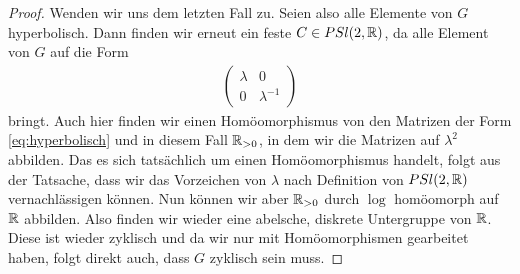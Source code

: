 \begin{proof}
  Wenden wir uns dem letzten Fall zu. Seien also alle Elemente von $G$
  hyperbolisch. Dann finden wir erneut ein feste $C \in PSl(2, \mathbb{R})$,
  da alle Element von $G$ auf die Form
  \begin{align}
    \label{eq:hyperbolisch}
  \begin{pmatrix}
    \lambda & 0 \\
    0 & \lambda^{-1}
  \end{pmatrix}
  \end{align}
  bringt. Auch hier finden wir einen Homöomorphismus von den Matrizen
  der Form \eqref{eq:hyperbolisch} und in diesem Fall $\mathbb{R}_{> 0}$, in
  dem wir die Matrizen auf $\lambda^2$ abbilden. Das es sich
  tatsächlich um einen Homöomorphismus handelt, folgt aus der
  Tatsache, dass wir das Vorzeichen von $\lambda$ nach Definition von
  $PSl(2, \mathbb{R})$ vernachlässigen können. Nun können wir aber $\mathbb{R}_{> 0}$
  durch $\log$ homöomorph auf $\mathbb{R}$ abbilden. Also finden wir wieder
  eine abelsche, diskrete Untergruppe von $\mathbb{R}$. Diese ist wieder
  zyklisch und da wir nur mit Homöomorphismen gearbeitet haben, folgt
  direkt auch, dass $G$ zyklisch sein muss.
\end{proof}

